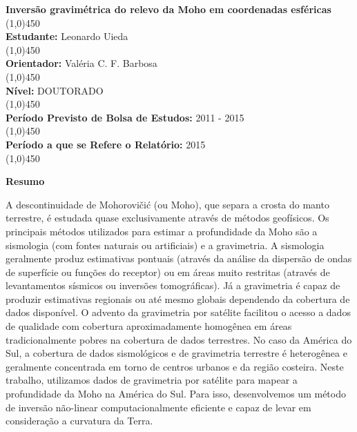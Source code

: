\documentclass[12pt]{letter}
\begin{document}
\thispagestyle{fancy}

\begin{flushleft}

\textbf{Inversão gravimétrica do relevo da Moho em coordenadas esféricas}\\
\line(1,0){450}
\\\textbf{Estudante:} Leonardo Uieda\\
\line(1,0){450}
\\\textbf{Orientador:} Valéria C. F. Barbosa\\
\line(1,0){450}
\\\textbf{Nível:} DOUTORADO\\
\line(1,0){450}
\\\textbf{Período Previsto de Bolsa de Estudos:} 2011 - 2015\\
\line(1,0){450}
\\\textbf{Período a que se Refere o Relatório:} 2015\\
\line(1,0){450}

\end{flushleft}

\textbf{Resumo}


A descontinuidade de Mohorovičić (ou Moho), que separa a crosta do manto
terrestre, é estudada quase exclusivamente através de métodos geofísicos.
Os principais métodos utilizados para estimar a profundidade da Moho são a
sismologia (com fontes naturais ou artificiais) e a gravimetria.
A sismologia geralmente produz estimativas pontuais (através da análise da
dispersão de ondas de superfície ou funções do receptor) ou em áreas muito
restritas (através de levantamentos sísmicos ou inversões tomográficas).
Já a gravimetria é capaz de produzir estimativas regionais ou até mesmo
globais dependendo da cobertura de dados disponível.
O advento da gravimetria por satélite facilitou o acesso a dados de qualidade
com cobertura aproximadamente homogênea em áreas tradicionalmente pobres na
cobertura de dados terrestres.
No caso da América do Sul, a cobertura de dados sismológicos e de gravimetria
terrestre é heterogênea e geralmente concentrada em torno de centros urbanos e
da região costeira.
Neste trabalho, utilizamos dados de gravimetria por satélite para mapear a
profundidade da Moho na América do Sul.
Para isso, desenvolvemos um método de inversão não-linear computacionalmente
eficiente e capaz de levar em consideração a curvatura da Terra.
\end{document}
